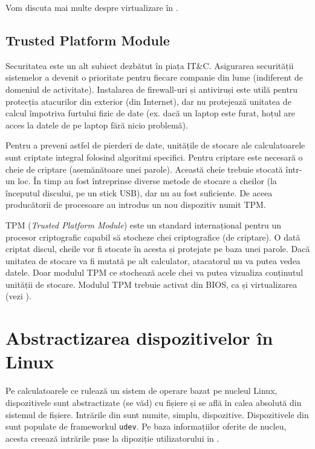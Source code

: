 Vom discuta mai multe despre virtualizare în .

\subsection{Trusted Platform Module}
\label{sec:hw:features:tpm}

Securitatea este un alt subiect dezbătut în piața IT\&C.
Asigurarea securității sistemelor a devenit o prioritate pentru fiecare companie din lume (indiferent de domeniul de activitate).
Instalarea de firewall-uri și antiviruși este utilă pentru protecția atacurilor din exterior (din Internet), dar nu protejează unitatea de calcul împotriva furtului fizic de date (ex. dacă un laptop este furat, hoțul are acces la datele de pe laptop fără nicio problemă).

Pentru a preveni astfel de pierderi de date, unitățile de stocare ale calculatoarele sunt criptate integral folosind algoritmi specifici.
Pentru criptare este necesară o cheie de criptare (asemănătoare unei parole).
Această cheie trebuie stocată într-un loc.
În timp au fost întreprinse diverse metode de stocare a cheilor (la începutul discului, pe un stick USB), dar nu au fost suficiente.
De aceea producătorii de procesoare au introdus un nou dispozitiv numit TPM.

TPM (\textit{Trusted Platform Module}) este un standard internațional pentru un procesor criptografic capabil să stocheze chei criptografice (de criptare).
O dată criptat discul, cheile vor fi stocate în acesta și protejate pe baza unei parole.
Dacă unitatea de stocare va fi mutată pe alt calculator, atacatorul nu va putea vedea datele.
Doar modulul TPM ce stochează acele chei va putea vizualiza conținutul unității de stocare.
Modulul TPM trebuie activat din BIOS, ca și virtualizarea (vezi ).

\section{Abstractizarea dispozitivelor în Linux}
\label{sec:hw:abstraction}

Pe calculatoarele ce rulează un sistem de operare bazat pe nucleul Linux, dispozitivele sunt abstractizate (se văd) cu fișiere și se află în calea absolută  din sistemul de fișiere.
Intrările din  sunt numite, simplu, dispozitive.
Dispozitivele din  sunt populate de frameworkul \texttt{udev}.
Pe baza informațiilor oferite de nucleu, acesta creează intrările puse la dipoziție utilizatorului in .

